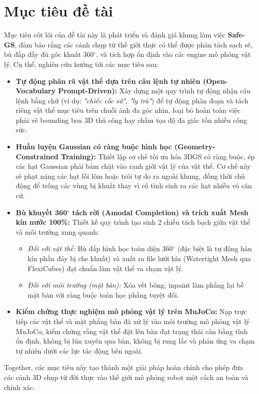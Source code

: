\section{Mục tiêu đề tài}
Mục tiêu cốt lõi của đề tài này là phát triển và đánh giá khung làm việc \textbf{Safe-GS}, đảm bảo rằng các cảnh chụp từ thế giới thực có thể được phân tách sạch sẽ, bù đắp đầy đủ góc khuất 360$^\circ$, và tích hợp ổn định vào các engine mô phỏng vật lý. Cụ thể, nghiên cứu hướng tới các mục tiêu sau:

\begin{itemize}
    \item \textbf{Tự động phân rã vật thể dựa trên câu lệnh tự nhiên (Open-Vocabulary Prompt-Driven):} 
    Xây dựng một quy trình tự động nhận câu lệnh bằng chữ (ví dụ: \textit{"chiếc cốc sứ"}, \textit{"ly trà"}) để tự động phân đoạn và tách riêng vật thể mục tiêu trên chuỗi ảnh đa góc nhìn, loại bỏ hoàn toàn việc phải vẽ bounding box 3D thủ công hay chấm tọa độ đa giác tốn nhiều công sức.

    \item \textbf{Huấn luyện Gaussian có ràng buộc hình học (Geometry-Constrained Training):} 
    Thiết lập cơ chế tối ưu hóa 3DGS có ràng buộc, ép các hạt Gaussian phải bám chặt vào ranh giới vật lý của vật thể. Cơ chế này sẽ phạt nặng các hạt lồi lõm hoặc trôi tự do ra ngoài khung, đồng thời chủ động để trống các vùng bị khuất thay vì cố tình sinh ra các hạt nhiễu vô căn cứ.

    \item \textbf{Bù khuyết 360$^\circ$ tách rời (Amodal Completion) và trích xuất Mesh kín nước 100\%:} 
    Thiết kế quy trình tạo sinh 2 chiều tách bạch giữa vật thể và môi trường xung quanh:
    \begin{itemize}
        \item \textit{Đối với vật thể:} Bù đắp hình học toàn diện 360$^\circ$ (đặc biệt là tự động hàn kín phần đáy bị che khuất) và xuất ra file lưới kín (Watertight Mesh qua FlexiCubes) đạt chuẩn làm vật thể va chạm vật lý.
        \item \textit{Đối với môi trường (mặt bàn):} Xóa vết bóng, inpaint làm phẳng lại bề mặt bàn với ràng buộc toán học phẳng tuyệt đối.
    \end{itemize}

    \item \textbf{Kiểm chứng thực nghiệm mô phỏng vật lý trên MuJoCo:} 
    Nạp trực tiếp các vật thể và mặt phẳng bàn đã xử lý vào môi trường mô phỏng vật lý MuJoCo, kiểm chứng rằng vật thể đặt lên bàn đạt trạng thái cân bằng tĩnh ổn định, không bị lún xuyên qua bàn, không bị rung lắc và phản ứng va chạm tự nhiên dưới các lực tác động bên ngoài.
\end{itemize}
Together, các mục tiêu này tạo thành một giải pháp hoàn chỉnh cho phép đưa các cảnh 3D chụp từ đời thực vào thế giới mô phỏng robot một cách an toàn và chính xác.
